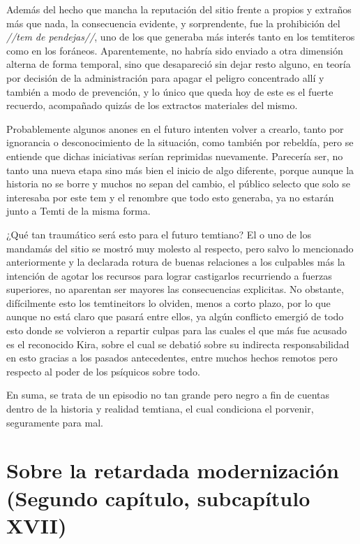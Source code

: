 \documentclass[
  spanish,
]{book}
\begin{document}
Además del hecho que mancha la reputación del sitio frente a propios y extraños más que nada, la consecuencia evidente, y sorprendente, fue la prohibición del \emph{//tem de pendejas//}, uno de los que generaba más interés tanto en los temtiteros como en los foráneos. Aparentemente, no habría sido enviado a otra dimensión alterna de forma temporal, sino que desapareció sin dejar resto alguno, en teoría por decisión de la administración para apagar el peligro concentrado allí y también a modo de prevención, y lo único que queda hoy de este es el fuerte recuerdo, acompañado quizás de los extractos materiales del mismo.

Probablemente algunos anones en el futuro intenten volver a crearlo, tanto por ignorancia o desconocimiento de la situación, como también por rebeldía, pero se entiende que dichas iniciativas serían reprimidas nuevamente. Parecería ser, no tanto una nueva etapa sino más bien el inicio de algo diferente, porque aunque la historia no se borre y muchos no sepan del cambio, el público selecto que solo se interesaba por este tem y el renombre que todo esto generaba, ya no estarán junto a Temti de la misma forma.

¿Qué tan traumático será esto para el futuro temtiano? El o uno de los mandamás del sitio se mostró muy molesto al respecto, pero salvo lo mencionado anteriormente y la declarada rotura de buenas relaciones a los culpables más la intención de agotar los recursos para lograr castigarlos recurriendo a fuerzas superiores, no aparentan ser mayores las consecuencias explicitas. No obstante, difícilmente esto los temtineitors lo olviden, menos a corto plazo, por lo que aunque no está claro que pasará entre ellos, ya algún conflicto emergió de todo esto donde se volvieron a repartir culpas para las cuales el que más fue acusado es el reconocido Kira, sobre el cual se debatió sobre su indirecta responsabilidad en esto gracias a los pasados antecedentes, entre muchos hechos remotos pero respecto al poder de los psíquicos sobre todo.

En suma, se trata de un episodio no tan grande pero negro a fin de cuentas dentro de la historia y realidad temtiana, el cual condiciona el porvenir, seguramente para mal.

\hypertarget{sobre-la-retardada-modernizaciuxf3n-segundo-capuxedtulo-subcapuxedtulo-xvii}{%
\section{Sobre la retardada modernización (Segundo capítulo, subcapítulo XVII)}\label{sobre-la-retardada-modernizaciuxf3n-segundo-capuxedtulo-subcapuxedtulo-xvii}}
\end{document}
